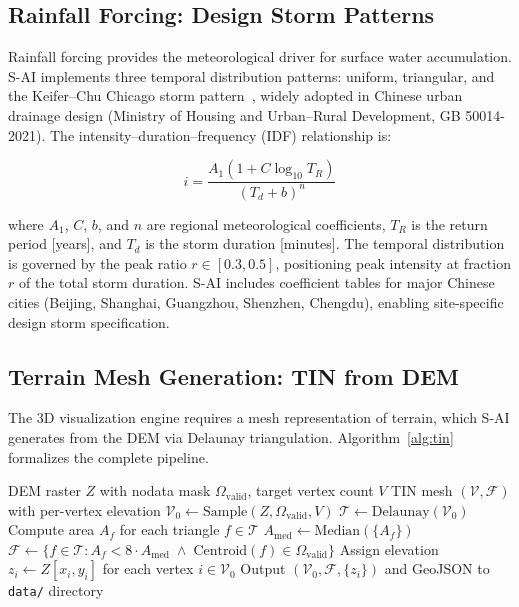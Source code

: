 \documentclass[11pt, a4paper]{article}
\begin{document}
\subsection{Rainfall Forcing: Design Storm Patterns}

Rainfall forcing provides the meteorological driver for surface water accumulation. S-AI implements three temporal distribution patterns: uniform, triangular, and the Keifer--Chu Chicago storm pattern~\cite{chicagostorm}, widely adopted in Chinese urban drainage design (Ministry of Housing and Urban--Rural Development, GB 50014-2021). The intensity--duration--frequency (IDF) relationship is:

\begin{equation}
  i = \frac{A_1\!\left(1 + C\log_{10} T_R\right)}{\left(T_d + b\right)^n}
  \label{eq:idf}
\end{equation}

\noindent where $A_1$, $C$, $b$, and $n$ are regional meteorological coefficients, $T_R$ is the return period [years], and $T_d$ is the storm duration [minutes]. The temporal distribution is governed by the peak ratio $r \in [0.3, 0.5]$, positioning peak intensity at fraction $r$ of the total storm duration. S-AI includes coefficient tables for major Chinese cities (Beijing, Shanghai, Guangzhou, Shenzhen, Chengdu), enabling site-specific design storm specification.

\subsection{Terrain Mesh Generation: TIN from DEM}
\label{sec:tin_method}

The 3D visualization engine requires a mesh representation of terrain, which S-AI generates from the DEM via Delaunay triangulation. Algorithm~\ref{alg:tin} formalizes the complete pipeline.

\begin{algorithm}[htbp]
\caption{TIN Mesh Generation from High-Resolution DEM}
\label{alg:tin}
\begin{algorithmic}[1]
\REQUIRE DEM raster $Z$ with nodata mask $\Omega_{\text{valid}}$, target vertex count $V$
\ENSURE TIN mesh $(\mathcal{V}, \mathcal{F})$ with per-vertex elevation
\STATE $\mathcal{V}_0 \leftarrow \text{Sample}(Z, \Omega_{\text{valid}}, V)$ 
\STATE $\mathcal{T} \leftarrow \text{Delaunay}(\mathcal{V}_0)$ 
\STATE Compute area $A_f$ for each triangle $f \in \mathcal{T}$
\STATE $A_{\text{med}} \leftarrow \text{Median}(\{A_f\})$
\STATE $\mathcal{F} \leftarrow \{f \in \mathcal{T} : A_f < 8 \cdot A_{\text{med}} \;\wedge\; \text{Centroid}(f) \in \Omega_{\text{valid}}\}$
\STATE Assign elevation $z_i \leftarrow Z[x_i, y_i]$ for each vertex $i \in \mathcal{V}_0$
\STATE Output $(\mathcal{V}_0, \mathcal{F}, \{z_i\})$ and GeoJSON to \texttt{data/} directory
\end{algorithmic}
\end{algorithm}
\end{document}
